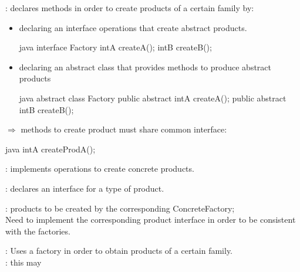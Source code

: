 \begin{partbox}\nospacing
  \begin{itemizenosep}
      \item {}: declares methods in order to
    create products of a certain family by:
    \begin{itemize}
        \item declaring an interface operations that create abstract products.
      \begin{mintlinebox}{java}
        interface Factory{
          intA createA();
          intB createB();
       }  
      \end{mintlinebox}
        \item declaring an abstract class that provides methods to produce
      abstract products
      \begin{mintlinebox}{java}
        abstract class Factory{
          public abstract intA createA();
          public abstract intB createB();
        }
      \end{mintlinebox}
    \end{itemize}
    $\Rightarrow$ methods to create product must share common interface:
    \begin{mintlinebox}{java}
      intA createProdA();
    \end{mintlinebox}
      \item {}: implements operations to create concrete
    products.
      \item {}: declares an interface for a type
    of product. 
      \item {}: products to be created by the corresponding
    ConcreteFactory;\\
    Need to implement the corresponding product interface in order to be
    consistent with the factories.
      \item {}: Uses a factory in order to obtain products of a
    certain family.\\
    : this may 
  \end{itemizenosep}
\end{partbox}
